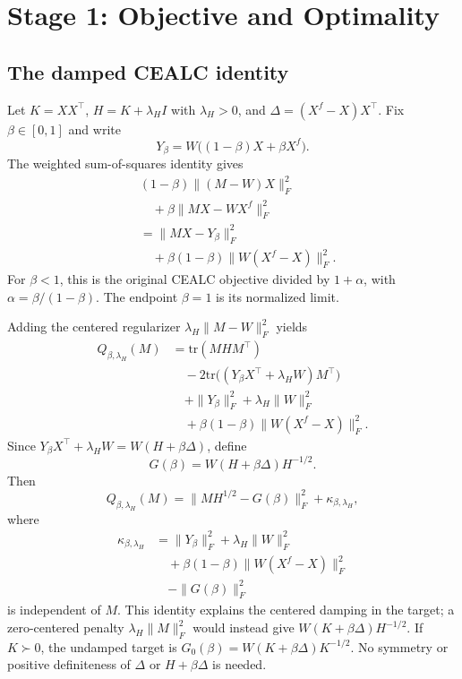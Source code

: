 \section{Stage 1: Objective and Optimality}\label{sup:thm1}

\subsection{The damped CEALC identity}\label{sup:cealc-identity}

Let $K=XX^\top$, $H=K+\lambda_H I$ with $\lambda_H>0$, and $\Delta=(X^f-X)X^\top$. Fix $\beta\in[0,1]$ and write
\begin{equation}
Y_\beta=W\big((1-\beta)X+\beta X^f\big).
\end{equation}
The weighted sum-of-squares identity gives
\begin{equation}
\begin{aligned}
&(1-\beta)\|(M-W)X\|_F^2\\
&\quad+\beta\|MX-WX^f\|_F^2 \\
&=\|MX-Y_\beta\|_F^2\\
&\quad+\beta(1-\beta)\|W(X^f-X)\|_F^2.
\end{aligned}
\end{equation}
For $\beta<1$, this is the original CEALC objective divided by $1+\alpha$, with $\alpha=\beta/(1-\beta)$. The endpoint $\beta=1$ is its normalized limit.

Adding the centered regularizer $\lambda_H\|M-W\|_F^2$ yields
\begin{equation}
\begin{aligned}
Q_{\beta,\lambda_H}(M)
&=\mathrm{tr}(MHM^\top) \\
&\quad-2\mathrm{tr}\big((Y_\beta X^\top+\lambda_H W)M^\top\big) \\
&\quad+\|Y_\beta\|_F^2+\lambda_H\|W\|_F^2 \\
&\quad+\beta(1-\beta)\|W(X^f-X)\|_F^2.
\end{aligned}
\end{equation}
Since $Y_\beta X^\top+\lambda_H W=W(H+\beta\Delta)$, define
\begin{equation}
G(\beta)=W(H+\beta\Delta)H^{-1/2}.
\end{equation}
Then
\begin{equation}
Q_{\beta,\lambda_H}(M)
=\|MH^{1/2}-G(\beta)\|_F^2+\kappa_{\beta,\lambda_H},
\end{equation}
where
\begin{equation}
\begin{aligned}
\kappa_{\beta,\lambda_H}
&=\|Y_\beta\|_F^2+\lambda_H\|W\|_F^2 \\
&\quad+\beta(1-\beta)\|W(X^f-X)\|_F^2\\
&\quad-\|G(\beta)\|_F^2
\end{aligned}
\end{equation}
is independent of $M$. This identity explains the centered damping in the target; a zero-centered penalty $\lambda_H\|M\|_F^2$ would instead give $W(K+\beta\Delta)H^{-1/2}$. If $K\succ0$, the undamped target is $G_0(\beta)=W(K+\beta\Delta)K^{-1/2}$. No symmetry or positive definiteness of $\Delta$ or $H+\beta\Delta$ is needed.

